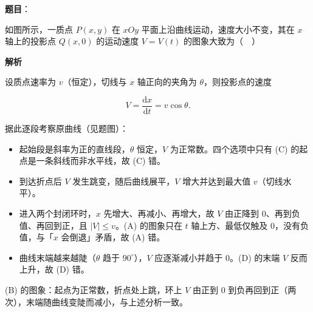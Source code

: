 \begin{answer}

\textbf{题目}：

如图所示，一质点 $P(x,y)$ 在 $xOy$ 平面上沿曲线运动，速度大小不变，其在 $x$ 轴上的投影点 $Q(x,0)$ 的运动速度 $V=V(t)$ 的图象大致为（　）
\nopagebreak[4]
\begin{center}\end{center}
\nopagebreak[4]
\textbf{解析}

设质点速率为 $v$（恒定），切线与 $x$ 轴正向的夹角为 $\theta$，则投影点的速度

\nopagebreak[4]
\[V=\frac{\mathrm dx}{\mathrm dt}=v\cos\theta.\]

据此逐段考察原曲线（见题图）：

\begin{itemize}
\item 起始段是斜率为正的直线段，$\theta$ 恒定，$V$ 为正常数。四个选项中只有 (C) 的起点是一条斜线而非水平线，故 (C) 错。
\item 到达折点后 $V$ 发生跳变，随后曲线展平，$V$ 增大并达到最大值 $v$（切线水平）。
\item 进入两个封闭环时，$x$ 先增大、再减小、再增大，故 $V$ 由正降到 $0$、再到负值、再回到正，且 $|V|\leqslant v$。(A) 的图象只在 $t$ 轴上方、最低仅触及 $0$，没有负值，与「$x$ 会倒退」矛盾，故 (A) 错。
\item 曲线末端越来越陡（$\theta$ 趋于 $90^\circ$），$V$ 应逐渐减小并趋于 $0$。(D) 的末端 $V$ 反而上升，故 (D) 错。
\end{itemize}

(B) 的图象：起点为正常数，折点处上跳，环上 $V$ 由正到 $0$ 到负再回到正（两次），末端随曲线变陡而减小，与上述分析一致。


\end{answer}
